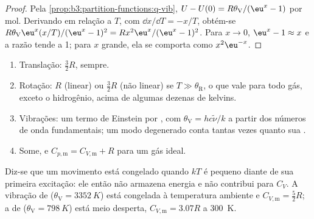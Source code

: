\begin{proof}
Pela \cref{prop:b3:partition-functions:q-vib}, $U - U(0) = R\theta_{\mathrm V}/(\eu^x - 1)$ por mol.
Derivando em relação a $T$, com $\dd x/\dd T = -x/T$, obtém-se
$R\theta_{\mathrm V}\eu^x(x/T)/(\eu^x - 1)^2 = Rx^2\eu^x/(\eu^x - 1)^2$. Para $x \to 0$, $\eu^x - 1 \approx x$ e a
razão tende a 1; para $x$ grande, ela se comporta como $x^2\eu^{-x}$.
\end{proof}

\begin{method}\label{met:b3:statistical-thermo-applied:cv}
\begin{enumerate}
  \item Translação: $\frac32R$, sempre.
  \item Rotação: $R$ (linear) ou $\frac32R$ (não linear) se $T \gg \theta_{\mathrm R}$, o que vale para
        todo gás, exceto o hidrogênio, acima de algumas dezenas de kelvins.
  \item Vibrações: um termo de Einstein por , com $\theta_{\mathrm V} = hc\tilde\nu/k$ a partir
        dos números de onda fundamentais; um modo degenerado conta tantas vezes
        quanto sua .
  \item Some, e $C_{p,\mathrm m} = C_{V,\mathrm m} + R$ para um gás ideal.
\end{enumerate}
\end{method}

Diz-se que um movimento está congelado quando $kT$ é pequeno diante de sua
primeira excitação: ele então não armazena energia e não contribui para $C_V$. A
vibração de  ($\theta_{\mathrm V} = \qty{3352}{K}$) está congelada à temperatura
ambiente e $C_{V,\mathrm m} = \frac52R$; a de  ($\theta_{\mathrm V} = \qty{798}{K}$) está
meio desperta, $C_{V,\mathrm m} = 3.07R$ a \qty{300}{K}.

